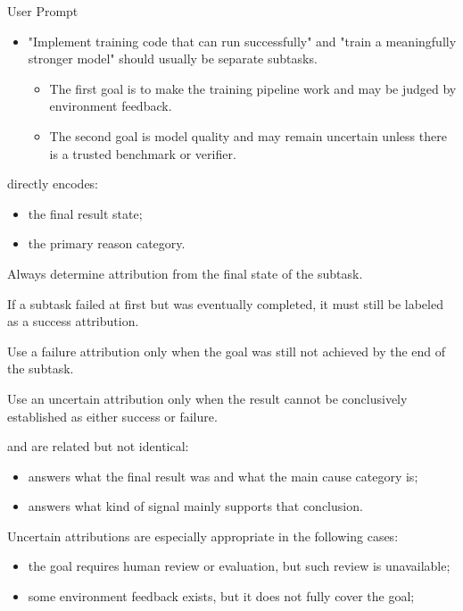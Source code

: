 \begin{svpromptbox}{User Prompt}
\begin{itemize}
\begin{itemize}
\end{itemize}
\item "Implement training code that can run successfully" and "train a meaningfully stronger model" should usually be separate subtasks.
\begin{itemize}
\item The first goal is to make the training pipeline work and may be judged by environment feedback.
\item The second goal is model quality and may remain uncertain unless there is a trusted benchmark or verifier.
\end{itemize}
\end{itemize}
\smallskip
{}
\smallskip
{} directly encodes:\par
\smallskip
\begin{itemize}
\item the final result state;
\item the primary reason category.
\end{itemize}
\smallskip
Always determine attribution from the final state of the subtask.\par
\smallskip
If a subtask failed at first but was eventually completed, it must still be labeled as a success attribution.\par
\smallskip
Use a failure attribution only when the goal was still not achieved by the end of the subtask.\par
\smallskip
Use an uncertain attribution only when the result cannot be conclusively established as either success or failure.\par
\smallskip
{} and  are related but not identical:\par
\smallskip
\begin{itemize}
\item {} answers what the final result was and what the main cause category is;
\item {} answers what kind of signal mainly supports that conclusion.
\end{itemize}
\smallskip
Uncertain attributions are especially appropriate in the following cases:\par
\smallskip
\begin{itemize}
\item the goal requires human review or evaluation, but such review is unavailable;
\item some environment feedback exists, but it does not fully cover the goal;

\end{itemize}
\end{svpromptbox}

